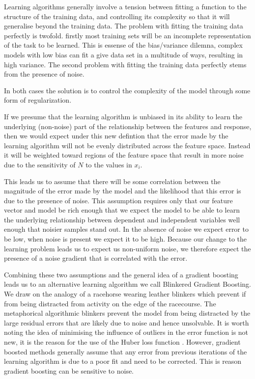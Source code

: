 \documentclass[11pt,twoside,a4paper]{article}
\begin{document}
Learning algorithms generally involve a tension between fitting a function to the structure of
the training data, and controlling its complexity so that it will generalise beyond the training
data. The problem with fitting the training data perfectly is twofold. firstly most training sets
will be an incomplete representation of the task to be learned. This is essense of the bias/variance
dilemna, complex models with low bias can fit a give data set in a multitude of ways, resulting in
high variance. The second problem with fitting the training data perfectly stems from the presence of noise.

In both cases the solution is to control the complexity of the model through some form of regularization.

If we presume that the learning algorithm is unbiased in its ability to learn the underlying
(non-noise) part of the relationship between the features and response, then we would expect
under this new defintion that the error made by the learning algorithm will not be evenly 
distributed across the feature space. Instead it will be weighted toward regions of the feature
space that result in more noise due to the sensitivity of $N$ to the values in $x_i$.

This leads us to assume that there will be some correlation between the magnitude of the error made
by the model and the likelihood that this error is due to the presence of noise. 
This assumption requires only that our feature vector and model be rich enough that we expect the 
model to be able to learn the underlying relationship between dependent and independent variables 
well enough that noisier samples stand out. In the absence of noise we expect error to be low, 
when noise is present we expect it to be high. Because our change to the learning problem leads us
to expect us non-uniform noise, we therefore expect the presence of a noise gradient that is correlated with the error.

Combining these two assumptions and the general idea of a gradient boosting leads us to
an alternative learning algorithm we call Blinkered Gradient Boosting. 
We draw on the analogy of a racehorse wearing 
leather blinkers which prevent if from being distracted from activity on the edge
of the racecourse. The metaphorical algorithmic blinkers prevent the model from being
distracted by the large residual errors that are likely due to noise and hence unsolvable.
It is worth noting the idea of minimising the influence of outliers in the error function is 
not new, it is the reason for the use of the Huber loss function \cite{}. However, gradient boosted
methods generally assume that any error from previous iterations of the learning algorithm is
due to a poor fit and need to be corrected. This is reason gradient boosting can be sensitive to
noise.
 
\end{document}
